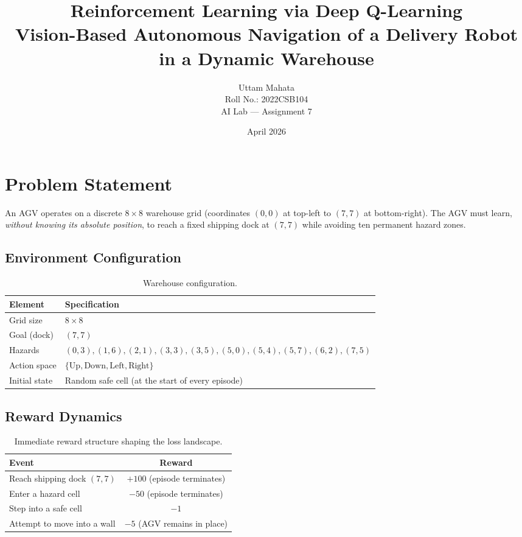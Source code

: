\documentclass[11pt]{article}
\title{\textbf{Reinforcement Learning via Deep Q-Learning} \\[0.3em]
\large Vision-Based Autonomous Navigation of a Delivery Robot in a Dynamic Warehouse}
\author{Uttam Mahata \\ Roll No.: 2022CSB104 \\ AI Lab --- Assignment 7}
\date{April 2026}
\begin{document}
\maketitle

\section{Problem Statement}

An AGV operates on a discrete $8 \times 8$ warehouse grid (coordinates $(0,0)$ at top-left to $(7,7)$ at bottom-right). The AGV must learn, \emph{without knowing its absolute position}, to reach a fixed shipping dock at $(7,7)$ while avoiding ten permanent hazard zones.

\subsection{Environment Configuration}

\begin{table}[H]
\centering
\begin{tabular}{@{}ll@{}}
\toprule
\textbf{Element} & \textbf{Specification} \\
\midrule
Grid size        & $8 \times 8$ \\
Goal (dock)      & $(7, 7)$ \\
Hazards          & $(0,3),(1,6),(2,1),(3,3),(3,5),(5,0),(5,4),(5,7),(6,2),(7,5)$ \\
Action space     & $\{\text{Up}, \text{Down}, \text{Left}, \text{Right}\}$ \\
Initial state    & Random safe cell (at the start of every episode) \\
\bottomrule
\end{tabular}
\caption{Warehouse configuration.}
\end{table}

\subsection{Reward Dynamics}

\begin{table}[H]
\centering
\begin{tabular}{@{}lc@{}}
\toprule
\textbf{Event} & \textbf{Reward} \\
\midrule
Reach shipping dock $(7,7)$   & $+100$ (episode terminates) \\
Enter a hazard cell           & $-50$ (episode terminates) \\
Step into a safe cell         & $-1$ \\
Attempt to move into a wall   & $-5$ (AGV remains in place) \\
\bottomrule
\end{tabular}
\caption{Immediate reward structure shaping the loss landscape.}
\end{table}
\end{document}
